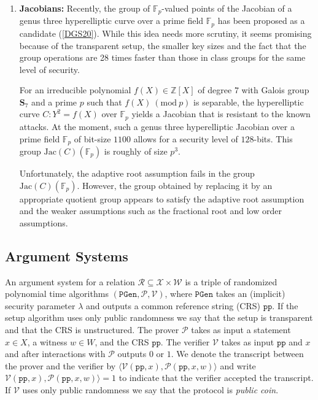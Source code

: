 \documentclass[11pt, lettersize, notitlepage, leqno, footskip=0.6cm]{article}
\newcommand{\bz}{\mathbb Z}
\newcommand{\bFp}{\mathbb{F}_p}
\newcommand{\ttt}{\texttt}
\newcommand{\mc}{\mathcal}
\newcommand{\mbf}{\mathbf}
\newcommand{\mr}{\mathrm}
\newcommand{\Jac}{\mr{Jac}}
\newcommand{\lam}{\lambda}
\newcommand{\sub}{\subseteq}
\newcommand{\mP}{\mc{P}}
\newcommand{\V}{\mc{V}}
\newcommand{\Mod}[1]{\ (\mathrm{mod}\ #1)}
\numberwithin{equation}{section}
\begin{document}
\begin{enumerate}[wide, labelwidth=!, labelindent=0pt]
\item \textbf{Jacobians:} Recently, the group of $\bFp$-valued points of the Jacobian of a genus three hyperelliptic curve over a prime field $\bFp$ has been proposed as a candidate (\hyperlink{DGS20}{[DGS20]}). While this idea needs more scrutiny, it seems promising because of the transparent setup, the smaller key sizes and the fact that the group operations are 28 times faster than those in class groups for the same level of security.

For an irreducible polynomial $f(X)\in \bz[X]$ of degree $7$ with Galois group $\mbf{S}_7$ and a prime $p$ such that $f(X)\Mod{p}$ is separable, the hyperelliptic curve $C:Y^2 = f(X)$ over $\bFp$ yields a Jacobian that is resistant to the known attacks. At the moment, such a genus three hyperelliptic Jacobian over a prime field $\bFp$ of bit-size $1100$ allows for a security level of $128$-bits. This group $\Jac(C)(\bFp)$ is roughly of size $p^3$.

Unfortunately, the adaptive root assumption fails in the group $\Jac(C)(\bFp)$. However, the group obtained by replacing it by an appropriate quotient group appears to satisfy the adaptive root assumption and the weaker assumptions such as the fractional root and low order assumptions. \end{enumerate}

\subsection{\fontsize{11}{11}\selectfont Argument Systems }


An argument system for a relation $\mc{R}\sub \mc{X} \times \mc{W}$ is a triple of randomized polynomial time algorithms $(\ttt{PGen}, \mP, \V)$, where $\ttt{PGen}$ takes an (implicit) security parameter $\lam$ and outputs a common reference string (CRS) $\ttt{pp}$. If the setup algorithm uses only public randomness we say that the setup is transparent and that the CRS is unstructured. The prover $\mP$ takes as input a statement $x \in X$, a witness $w \in W$, and the CRS $\ttt{pp}$. The verifier $\V$ takes as input $\ttt{pp}$ and $x$ and after interactions with $\mP$ outputs $0$ or $1$. We denote the transcript between the prover and the verifier by $\langle\V(\ttt{pp}, x),\mP(\ttt{pp}, x, w)\rangle$ and write $\V(\ttt{pp}, x), \mP(\ttt{pp}, x, w)\rangle = 1$ to indicate that the verifier accepted the transcript. If $\V$ uses only public randomness we say that the protocol is \textit{public coin}.
\end{document}
